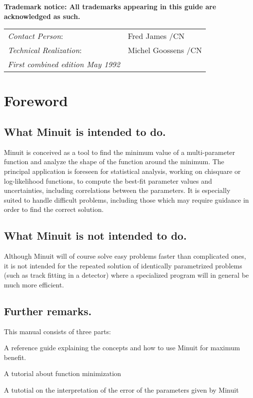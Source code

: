 {\bf Trademark notice: All trademarks appearing in this guide are acknowledged as such.}
\vfill
\begin{tabular}{l@{\quad}l}
{\em Contact Person\/}:        & Fred James /CN      \\[1mm]
{\em Technical Realization\/}: & Michel Goossens /CN \\[5mm]
{\em First combined edition May 1992} 
\end{tabular}
\newpage
 
\setcounter{page}{1}

\chapter*{Foreword}

\section*{What Minuit is intended to do.}

Minuit is conceived as a tool to find the minimum value of a
multi-parameter function and analyze the shape of the function
around the minimum. The principal application is foreseen for
statistical analysis, working on chisquare or
log-likelihood functions,
to compute the best-fit parameter values and uncertainties,
including correlations between the parameters.
It is especially suited to handle difficult problems, including those
which may require guidance in order to find the correct solution.
 
\section*{What Minuit is not intended to do.}

Although Minuit will of course solve easy problems faster than complicated
ones, it is not intended for the repeated solution of identically parametrized
problems (such as track fitting in a detector) where a specialized
program will in general be much more efficient.
 
\section*{Further remarks.}
 
This manual consists of three parts:
\begin{OL}
\item A reference guide explaining the concepts and
      how to use Minuit for maximum benefit.
\item A tutorial about function minimization
\item A tutotial on the interpretation of the error of the
      parameters given by Minuit
\end{OL}

